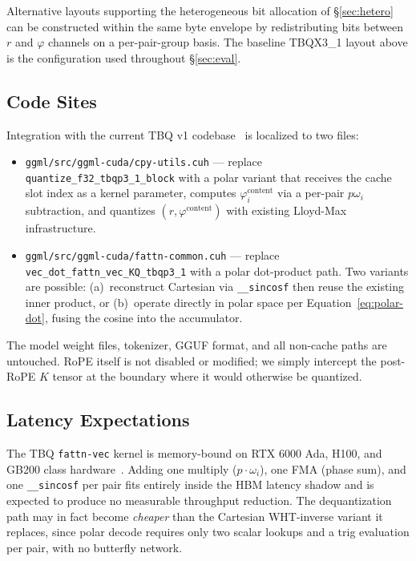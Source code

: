 \documentclass[10pt,twocolumn]{article}
\begin{document}
Alternative layouts supporting the heterogeneous bit allocation of \S\ref{sec:hetero} can be constructed within the same byte envelope by redistributing bits between $r$ and $\varphi$ channels on a per-pair-group basis. The baseline TBQX3\_1 layout above is the configuration used throughout \S\ref{sec:eval}.

\subsection{Code Sites}

Integration with the current TBQ v1 codebase~\cite{turboquant_impl2026} is localized to two files:

\begin{itemize}[leftmargin=*,topsep=2pt,itemsep=1pt]
\item \texttt{ggml/src/ggml-cuda/cpy-utils.cuh} --- replace
\texttt{quantize\_f32\_tbqp3\_1\_block} with a polar variant that
receives the cache slot index as a kernel parameter, computes
$\varphi^{\text{content}}_i$ via a per-pair $p\omega_i$ subtraction,
and quantizes $(r,\varphi^{\text{content}})$ with existing Lloyd-Max
infrastructure.
\item \texttt{ggml/src/ggml-cuda/fattn-common.cuh} --- replace
\texttt{vec\_dot\_fattn\_vec\_KQ\_tbqp3\_1} with a polar dot-product
path. Two variants are possible: (a)~reconstruct Cartesian via
\texttt{\_\_sincosf} then reuse the existing inner product, or
(b)~operate directly in polar space per Equation~\eqref{eq:polar-dot},
fusing the cosine into the accumulator.
\end{itemize}

The model weight files, tokenizer, GGUF format, and all non-cache paths
are untouched. RoPE itself is not disabled or modified; we simply
intercept the post-RoPE $K$ tensor at the boundary where it would
otherwise be quantized.

\subsection{Latency Expectations}

The TBQ \texttt{fattn-vec} kernel is memory-bound on RTX 6000 Ada, H100, and GB200 class hardware~\cite{turboquant_impl2026}. Adding one multiply ($p\cdot\omega_i$), one FMA (phase sum), and one \texttt{\_\_sincosf} per pair fits entirely inside the HBM latency shadow and is expected to produce no measurable throughput reduction. The dequantization path may in fact become \emph{cheaper} than the Cartesian WHT-inverse variant it replaces, since polar decode requires only two scalar lookups and a trig evaluation per pair, with no butterfly network.
\end{document}
